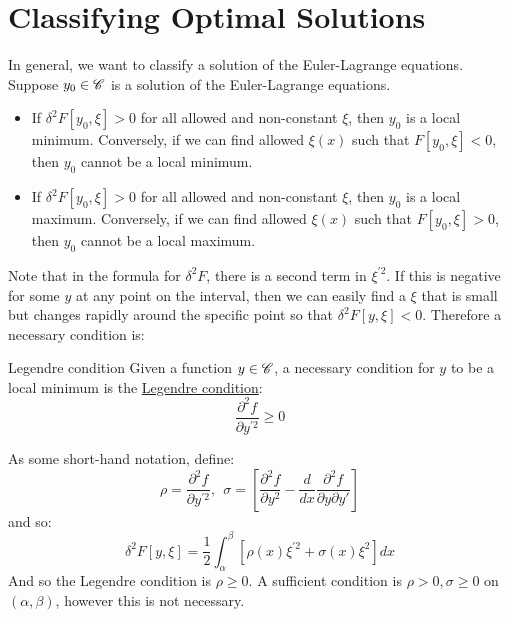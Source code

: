 \documentclass[../Main.tex]{subfiles}
\begin{document}
\section{Classifying Optimal Solutions}
In general, we want to classify a solution of the Euler-Lagrange equations. Suppose $y_0 \in \mathscr{C}$ is a solution of the Euler-Lagrange equations.
\begin{itemize}
    \item If $\delta^2 F[y_0, \xi] > 0$ for all allowed and non-constant $\xi$, then $y_0$ is a local minimum. Conversely, if we can find allowed $\xi(x)$ such that $F[y_0, \xi] < 0$, then $y_0$ cannot be a local minimum.
    \item If $\delta^2 F[y_0, \xi] > 0$ for all allowed and non-constant $\xi$, then $y_0$ is a local maximum. Conversely, if we can find allowed $\xi(x)$ such that $F[y_0, \xi] > 0$, then $y_0$ cannot be a local maximum.
\end{itemize}
Note that in the formula for $\delta^2 F$, there is a second term in $\xi^{\prime 2}$. If this is negative for some $y$ at any point on the interval, then we can easily find a $\xi$ that is small but changes rapidly around the specific point so that $\delta^2 F[y, \xi] < 0$. Therefore a necessary condition is:
\begin{definition}{Legendre condition}
    Given a function $y \in \mathscr{C}$, a necessary condition for $y$ to be a local minimum is the \underline{Legendre condition}:
    \begin{equation}
        \frac{\partial^2 f}{\partial y^{\prime 2}} \geq 0
        \label{eqnLegendreCondition}
    \end{equation}
\end{definition}
As some short-hand notation, define:
\begin{equation*}
    \rho = \frac{\partial^2 f}{\partial y^{\prime 2}},~~\sigma = \left[\frac{\partial^2 f}{\partial y^2} - \frac{d}{dx} \frac{\partial^2f}{\partial y \partial y'}\right]
\end{equation*}
and so:
\begin{equation}
    \delta^2 F[y, \xi] = \frac{1}{2} \int_\alpha^\beta \left[\rho(x) \xi^{\prime 2} + \sigma(x) \xi^2\right]dx
    \label{eqnSecondVariationShorthand}
\end{equation}
And so the Legendre condition is $\rho \geq 0$. A sufficient condition is $\rho > 0, \sigma \geq 0$ on $(\alpha, \beta)$, however this is not necessary.
\end{document}
